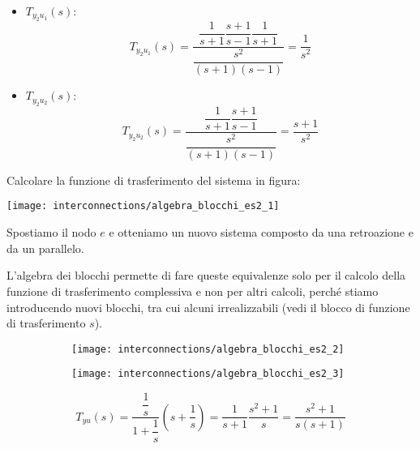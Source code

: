 \documentclass[../main.tex]{subfiles}
\begin{document}
\begin{mdframed}[style=Exercise]
\begin{Exercise}[title={Calcolare tutte le funzioni di trasferimento}, difficulty=3]
\begin{itemize}
						Questa funzione di trasferimento \'e instabile BIBO perch\'e c'\'e un polo a $ \Re = 0 $.
						Abbiamo ottenuto una funzione di trasferimento semplicemente propria perch\'e tra $ u_2 $ e $ y_1 $ in catena diretta c'\'e una dipendenza istantanea (dato dalla costante):
						\[ 
							T^{(2)}(s) = \frac{s+1}{s-1} = 1 + \frac{2}{s-1}
						\]
					\item 
						$ T_{y_2 u_1}(s) $:
						\[ 
							T_{y_2 u_1}(s) = \dfrac{\dfrac{1}{s+1}\dfrac{s+1}{s-1}\dfrac{1}{s+1}}{\dfrac{s^2}{(s+1)(s-1)}} = \dfrac{1}{s^2} 
						\]
					\item 
						$ T_{y_2 u_2}(s) $:
						\[
							T_{y_2 u_2}(s) = \dfrac{\dfrac{1}{s+1}\dfrac{s+1}{s-1}}{\dfrac{s^2}{(s+1)(s-1)}} = \dfrac{s+1}{s^2}
						\]
				\end{itemize}
			\end{Exercise}
		\end{mdframed}
	
		\begin{mdframed}[style=Exercise]		
			\begin{Exercise}[title={Calcolare la funzione di trasferimento}, difficulty=2]
				Calcolare la funzione di trasferimento del sistema in figura:
				\begin{center}
					\texttt{[image: interconnections/algebra\_blocchi\_es2\_1]}
				\end{center}
				Spostiamo il nodo $ e $ e otteniamo un nuovo sistema composto da una retroazione e da un parallelo.
				
				L'algebra dei blocchi permette di fare queste equivalenze solo per il calcolo della funzione di trasferimento complessiva e non per altri calcoli, perch\'e stiamo introducendo nuovi blocchi, tra cui alcuni irrealizzabili (vedi il blocco di funzione di trasferimento $ s $).
				\begin{figure}[H]
					\centering
					\begin{subfigure}{0.5\textwidth}
						\texttt{[image: interconnections/algebra\_blocchi\_es2\_2]}
					\end{subfigure}
					\begin{subfigure}{0.5\textwidth}
						\texttt{[image: interconnections/algebra\_blocchi\_es2\_3]}
					\end{subfigure}
				\end{figure}
				\[
					T_{yu}(s) = 
					\dfrac{\dfrac{1}{s}}{1 + \dfrac{1}{s}} \left( s + \dfrac{1}{s} \right) =
					\dfrac{1}{s+1} \dfrac{s^2+1}{s} =
					\dfrac{s^2 + 1}{s(s + 1)}
				\]
			\end{Exercise}
		\end{mdframed}
\end{document}
